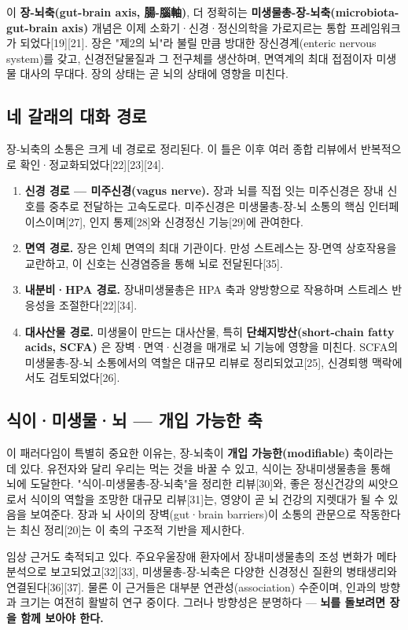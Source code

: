 \documentclass[11pt,oneside]{book}
\begin{document}
이 \textbf{장-뇌축(gut-brain axis, 腸-腦軸)}, 더 정확히는 \textbf{미생물총-장-뇌축(microbiota-gut-brain axis)} 개념은 이제 소화기·신경·정신의학을 가로지르는 통합 프레임워크가 되었다[19][21]. 장은 "제2의 뇌"라 불릴 만큼 방대한 장신경계(enteric nervous system)를 갖고, 신경전달물질과 그 전구체를 생산하며, 면역계의 최대 접점이자 미생물 대사의 무대다. 장의 상태는 곧 뇌의 상태에 영향을 미친다.

\subsection{네 갈래의 대화 경로}
장-뇌축의 소통은 크게 네 경로로 정리된다. 이 틀은 이후 여러 종합 리뷰에서 반복적으로 확인·정교화되었다[22][23][24].

\begin{enumerate}[leftmargin=6mm,itemsep=1pt,topsep=2pt]
  \item \textbf{신경 경로 — 미주신경(vagus nerve).} 장과 뇌를 직접 잇는 미주신경은 장내 신호를 중추로 전달하는 고속도로다. 미주신경은 미생물총-장-뇌 소통의 핵심 인터페이스이며[27], 인지 통제[28]와 신경정신 기능[29]에 관여한다.
  \item \textbf{면역 경로.} 장은 인체 면역의 최대 기관이다. 만성 스트레스는 장-면역 상호작용을 교란하고, 이 신호는 신경염증을 통해 뇌로 전달된다[35].
  \item \textbf{내분비·HPA 경로.} 장내미생물총은 HPA 축과 양방향으로 작용하며 스트레스 반응성을 조절한다[22][34].
  \item \textbf{대사산물 경로.} 미생물이 만드는 대사산물, 특히 \textbf{단쇄지방산(short-chain fatty acids, SCFA)} 은 장벽·면역·신경을 매개로 뇌 기능에 영향을 미친다. SCFA의 미생물총-장-뇌 소통에서의 역할은 대규모 리뷰로 정리되었고[25], 신경퇴행 맥락에서도 검토되었다[26].
\end{enumerate}
\subsection{식이·미생물·뇌 — 개입 가능한 축}
이 패러다임이 특별히 중요한 이유는, 장-뇌축이 \textbf{개입 가능한(modifiable)} 축이라는 데 있다. 유전자와 달리 우리는 먹는 것을 바꿀 수 있고, 식이는 장내미생물총을 통해 뇌에 도달한다. "식이-미생물총-장-뇌축"을 정리한 리뷰[30]와, 좋은 정신건강의 씨앗으로서 식이의 역할을 조망한 대규모 리뷰[31]는, 영양이 곧 뇌 건강의 지렛대가 될 수 있음을 보여준다. 장과 뇌 사이의 장벽(gut·brain barriers)이 소통의 관문으로 작동한다는 최신 정리[20]는 이 축의 구조적 기반을 제시한다.

임상 근거도 축적되고 있다. 주요우울장애 환자에서 장내미생물총의 조성 변화가 메타분석으로 보고되었고[32][33], 미생물총-장-뇌축은 다양한 신경정신 질환의 병태생리와 연결된다[36][37]. 물론 이 근거들은 대부분 연관성(association) 수준이며, 인과의 방향과 크기는 여전히 활발히 연구 중이다. 그러나 방향성은 분명하다 — \textbf{뇌를 돌보려면 장을 함께 보아야 한다.}
\end{document}
